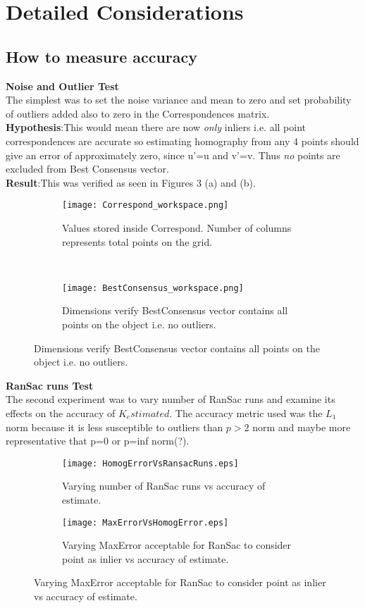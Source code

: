 \documentclass[titlepage]{article}
\begin{document}
\section{Detailed Considerations}
\subsection{How to measure accuracy}
\textbf{Noise and Outlier Test}\\
The simplest was to set the noise variance and mean to zero and set probability of outliers added also to zero in the Correspondences matrix.\\
\textbf{Hypothesis}:This would mean there are now \textit{only} inliers i.e. all point correspondences are accurate so estimating homography from any 4 points should give an error of approximately zero, since u’=u and v’=v. Thus \textit{no} points are excluded from Best Consensus vector. \\
\textbf{Result}:This was verified as seen in Figures 3 (a) and (b).\\
%
\begin{figure}
\begin{subfigure}{0.5\textwidth}
\label{Correspond}
\texttt{[image: Correspond\_workspace.png]}
\caption{Values stored inside Correspond. Number of columns represents total points on the grid.}
\end{subfigure}\\
\begin{subfigure}{0.5\textwidth}
\label{Consensus}
\texttt{[image: BestConsensus\_workspace.png]}
\caption{Dimensions verify BestConsensus vector contains all points on the object i.e. no outliers.}
\end{subfigure}
\end{figure}
\textbf{RanSac runs Test}\\
The second experiment was to vary number of RanSac runs and examine its effects on the accuracy of $K_estimated$. The accuracy metric used was the $L_{1}$ norm because it is less susceptible to outliers than $p > 2$ norm and maybe more representative that p=0 or p=inf norm(?).
\begin{figure}
\begin{subfigure}{0.25\textwidth}
\texttt{[image: HomogErrorVsRansacRuns.eps]}
\caption{Varying number of RanSac runs vs accuracy of estimate.}
\label{RansacRunsVsAccuracy}
\end{subfigure}\hspace{1cm}
\begin{subfigure}{0.25\textwidth}
\texttt{[image: MaxErrorVsHomogError.eps]}
\caption{Varying MaxError acceptable for RanSac to consider point as inlier vs accuracy of estimate.}
\label{MaxErrorVsAccuracy}
\end{subfigure} 
\end{figure}
\end{document}
